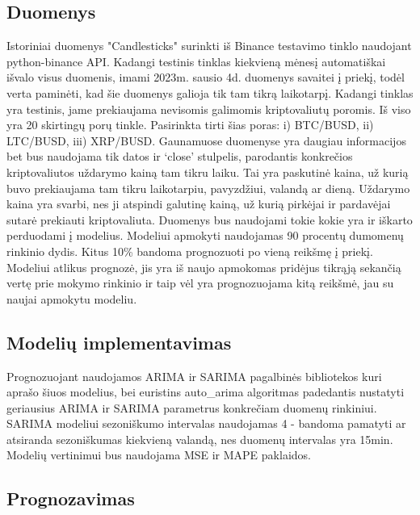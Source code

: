 \documentclass{VUMIFInfKursinis}
\begin{document}
\subsection{Duomenys}
Istoriniai duomenys "Candlesticks" surinkti iš Binance testavimo tinklo naudojant python-binance API. Kadangi testinis tinklas kiekvieną mėnesį automatiškai 
išvalo visus duomenis, imami 2023m. sausio 4d. duomenys savaitei į priekį, todėl verta paminėti, kad šie duomenys galioja tik tam tikrą laikotarpį. 
Kadangi tinklas yra testinis, jame prekiaujama nevisomis galimomis kriptovaliutų poromis. Iš viso yra 20 skirtingų porų tinkle. Pasirinkta tirti šias poras: 
i) BTC/BUSD, ii) LTC/BUSD, iii) XRP/BUSD.
Gaunamuose duomenyse yra daugiau informacijos bet bus naudojama tik datos ir `close' stulpelis, parodantis konkrečios kriptovaliutos uždarymo kainą tam tikru laiku. Tai yra paskutinė 
kaina, už kurią buvo prekiaujama tam tikru laikotarpiu, pavyzdžiui, valandą ar dieną. Uždarymo kaina yra svarbi, nes ji atspindi galutinę kainą, už kurią pirkėjai ir pardavėjai
sutarė prekiauti kriptovaliuta. Duomenys bus naudojami tokie kokie yra ir iškarto perduodami į modelius. Modeliui apmokyti naudojamas 90 procentų dumomenų rinkinio dydis.
Kitus 10\% bandoma prognozuoti po vieną reikšmę į priekį. Modeliui atlikus prognozė, jis yra iš naujo apmokomas pridėjus tikrąją sekančią vertę prie mokymo rinkinio ir
taip vėl yra prognozuojama kitą reikšmė, jau su naujai apmokytu modeliu.

\subsection{Modelių implementavimas}
Prognozuojant naudojamos ARIMA ir SARIMA pagalbinės bibliotekos\cite{seabold2010statsmodels} kuri aprašo šiuos modelius, 
bei euristins auto\_arima algoritmas\cite{pmdarima} padedantis nustatyti geriausius ARIMA ir SARIMA parametrus konkrečiam duomenų rinkiniui.
SARIMA modeliui sezoniškumo intervalas naudojamas 4 - bandoma pamatyti ar atsiranda sezoniškumas kiekvieną valandą, nes duomenų intervalas yra 15min.
Modelių vertinimui bus naudojama MSE ir MAPE paklaidos.

\subsection{Prognozavimas}
\end{document}

